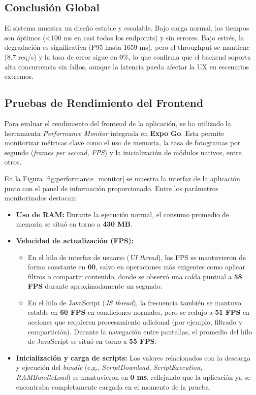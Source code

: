 \subsection*{Conclusión Global}

El sistema muestra un diseño estable y escalable. Bajo carga normal, los tiempos son óptimos (<100 ms en casi todos los endpoints) y sin errores. Bajo estrés, la degradación es significativa (P95 hasta 1659 ms), pero el throughput se mantiene (8.7 req/s) y la tasa de error sigue en 0\%, lo que confirma que el backend soporta alta concurrencia sin fallos, aunque la latencia pueda afectar la UX en escenarios extremos.

\subsection{Pruebas de Rendimiento del Frontend}

Para evaluar el rendimiento del frontend de la aplicación, se ha utilizado la herramienta \textit{Performance Monitor} integrada en \textbf{Expo Go}. Esta permite monitorizar métricas clave como el uso de memoria, la tasa de fotogramas por segundo (\textit{frames per second, FPS}) y la inicialización de módulos nativos, entre otros.

En la Figura \ref{fig:performance_monitor} se muestra la interfaz de la aplicación junto con el panel de información proporcionado. Entre los parámetros monitorizados destacan:

\begin{itemize}
    \item \textbf{Uso de RAM:} Durante la ejecución normal, el consumo promedio de memoria se situó en torno a \textbf{430 MB}.
    \item \textbf{Velocidad de actualización (FPS):} 
    \begin{itemize}
        \item En el hilo de interfaz de usuario (\textit{UI thread}), los FPS se mantuvieron de forma constante en \textbf{60}, salvo en operaciones más exigentes como aplicar filtros o compartir contenido, donde se observó una caída puntual a \textbf{58 FPS} durante aproximadamente un segundo.
        \item En el hilo de JavaScript (\textit{JS thread}), la frecuencia también se mantuvo estable en \textbf{60 FPS} en condiciones normales, pero se redujo a \textbf{51 FPS} en acciones que requieren procesamiento adicional (por ejemplo, filtrado y compartición). Durante la navegación entre pantallas, el promedio del hilo de JavaScript se situó en torno a \textbf{55 FPS}.
    \end{itemize}
    \item \textbf{Inicialización y carga de scripts:} Los valores relacionados con la descarga y ejecución del \textit{bundle} (e.g., \textit{ScriptDownload}, \textit{ScriptExecution}, \textit{RAMBundleLoad}) se mantuvieron en \textbf{0 ms}, reflejando que la aplicación ya se encontraba completamente cargada en el momento de la prueba.
\end{itemize}


